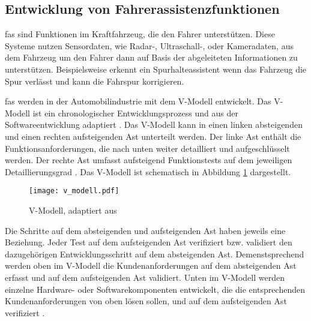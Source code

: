 \subsection{Entwicklung von Fahrerassistenzfunktionen}
\label{grundlagen_fahren_entwicklung}

\gls{fas} sind Funktionen im Kraftfahrzeug, die den Fahrer unterstützen. Diese Systeme nutzen Sensordaten, wie Radar-, Ultraschall-, oder Kameradaten, aus dem Fahrzeug um den Fahrer dann auf Basis der abgeleiteten Informationen zu unterstützen. Beispielsweise erkennt ein Spurhalteassistent wenn das Fahrzeug die Spur verlässt und kann die Fahrspur korrigieren. 

\gls{fas} werden in der Automobilindustrie mit dem V-Modell entwickelt. Das V-Modell ist ein chronologischer Entwicklungsprozess und aus der Softwareentwicklung adaptiert \cite{vmodell2005}. Das V-Modell kann in einen linken absteigenden und einen rechten aufsteigenden Ast unterteilt werden. Der linke Ast enthält die Funktionsanforderungen, die nach unten weiter detailliert und aufgeschlüsselt werden. Der rechte Ast umfasst aufsteigend Funktionstests auf dem jeweiligen Detaillierungsgrad \cite{hakuli2015virtuelle}. Das V-Modell ist schematisch in Abbildung \ref{fig_v_modell} dargestellt.

\begin{figure}[h]
\centering
\texttt{[image: v\_modell.pdf]}
\caption{V-Modell, adaptiert aus \cite{hakuli2015virtuelle}}
\label{fig_v_modell}
\end{figure}

Die Schritte auf dem absteigenden und aufsteigenden Ast haben jeweils eine Beziehung. Jeder Test auf dem aufsteigenden Ast verifiziert bzw. validiert den dazugehörigen Entwicklungsschritt auf dem absteigenden Ast. Demenstsprechend werden oben im V-Modell die Kundenanforderungen auf dem absteigenden Ast erfasst und auf dem aufsteigenden Ast validiert. Unten im V-Modell werden einzelne Hardware- oder Softwarekomponenten entwickelt, die die entsprechenden Kundenanforderungen von oben lösen sollen, und auf dem aufsteigenden Ast verifiziert \cite{hakuli2015virtuelle}.

